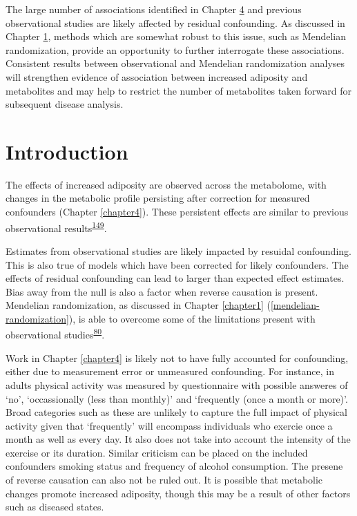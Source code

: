 \documentclass[11pt,twoside]{bristolthesis}
\begin{document}
The large number of associations identified in Chapter \protect\hyperlink{chapter4}{4} and previous observational studies are likely affected by residual confounding. As discussed in Chapter \protect\hyperlink{chapter1}{1}, methods which are somewhat robust to this issue, such as Mendelian randomization, provide an opportunity to further interrogate these associations. Consistent results between observational and Mendelian randomization analyses will strengthen evidence of association between increased adiposity and metabolites and may help to restrict the number of metabolites taken forward for subsequent disease analysis.

\hypertarget{introduction}{%
\section{Introduction}\label{introduction}}

The effects of increased adiposity are observed across the metabolome, with changes in the metabolic profile persisting after correction for measured confounders (Chapter \ref{chapter4}). These persistent effects are similar to previous observational results\textsuperscript{\protect\hyperlink{ref-Wurtz2014}{149}}.

Estimates from observational studies are likely impacted by resuidal confounding. This is also true of models which have been corrected for likely confounders. The effects of residual confounding can lead to larger than expected effect estimates. Bias away from the null is also a factor when reverse causation is present. Mendelian randomization, as discussed in Chapter \ref{chapter1} (\ref{mendelian-randomization}), is able to overcome some of the limitations present with observational studies\textsuperscript{\protect\hyperlink{ref-DaveySmith2003}{80}}.

Work in Chapter \ref{chapter4} is likely not to have fully accounted for confounding, either due to measurement error or unmeasured confounding. For instance, in adults physical activity was measured by questionnaire with possible answeres of `no', `occassionally (less than monthly)' and `frequently (once a month or more)'. Broad categories such as these are unlikely to capture the full impact of physical activity given that `frequently' will encompass individuals who exercie once a month as well as every day. It also does not take into account the intensity of the exercise or its duration. Similar criticism can be placed on the included confounders smoking status and frequency of alcohol consumption. The presene of reverse causation can also not be ruled out. It is possible that metabolic changes promote increased adiposity, though this may be a result of other factors such as diseased states.
\end{document}
